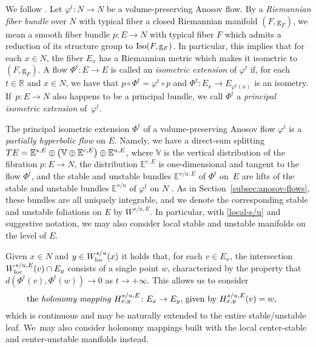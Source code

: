 \documentclass[10pt,a4paper]{amsart}
\newcommand{\g}{\mathrm{g}}
\newcommand{\R}{\mathbb{R}}
\newcommand{\E}{\mathbb{E}}
\numberwithin{equation}{section}
\theoremstyle{definition}
\begin{document}
We follow \cite[Section 2]{lefeuvre2023isometric}. Let $\varphi^t \colon N \rightarrow N$ be a volume-preserving Anosov flow. By a \emph{Riemannian fiber bundle} over $N$ with typical fiber a closed Riemannian manifold $(F,\g_F)$, we mean a smooth fiber bundle $p \colon E \rightarrow N$ with typical fiber $F$ which admits a reduction of its structure group to ${\rm Iso}(F,\g_F)$. In particular, this implies that for each $x \in N$, the fiber $E_x$ has a Riemannian metric which makes it isometric to $(F,\g_F)$. A flow $\Phi^t\colon E\to E$ is called an \emph{isometric extension} of $\varphi^t$ if, for each $t\in \R$ and $x\in N$, we have that $p\circ \Phi^t = \varphi^t\circ p$ and $\Phi^t\colon E_x\to E_{\varphi^t(x)}$ is an isometry. If~$p\colon E\to N$ also happens to be a principal bundle, we call $\Phi^t$ a \emph{principal isometric extension} of~$\varphi^t$.

The principal isometric extension $\Phi^t$ of a volume-preserving Anosov flow $\varphi^t$ is a \emph{partially hyperbolic flow} on $E$. Namely, we have a direct-sum splitting $TE = \E^{s,E} \oplus \smash{\bigl(\mathbb{V} \oplus \E^{c,E}\bigr)} \oplus \E^{u,E}$, where $\mathbb{V}$ is the vertical distribution of the fibration $p\colon E\to N$, the distribution $\E^{c,E}$ is one-dimensional and tangent to the flow $\Phi^t$, and the stable and unstable bundles $\E^{s/u,E}$ of $\Phi^t$ on~$E$ are lifts of the stable and unstable bundles $\E^{s/u}$ of $\varphi^t$ on $N$ \smash{\big(i.e., ${\rm d}p\bigl(\E^{s/u,E}\bigr) = \E^{s/u}$\big)}. As in Section~\ref{subsec:anosov-flows}, these bundles are all uniquely integrable, and we denote the corresponding stable and unstable foliations on $E$ by $W^{s/u,E}$. In particular, with \eqref{local-s/u} and suggestive notation, we may also consider local stable and unstable manifolds on the level of $E$.

Given $x\in N$ and $y\in W^{s/u}_{\rm loc}(x)$ it holds that, for each $v\in E_x$, the intersection $W^{s/u,E}_{\rm loc}(v)\cap E_y$ consists of a single point $w$, characterized by the property that $d(\Phi^t(v), \Phi^t(w))\to 0$ as $t \to +\infty$. This allows us to consider
\begin{equation}\label{holonomy-map}
 \parbox{.9\textwidth}{the \emph{holonomy mapping} $H_{x,y}^{s/u, E}\colon E_x\to E_y$, given by $H_{x,y}^{s/u,E}(v) = w$,}
\end{equation}which is continuous and may be naturally extended to the entire stable/unstable leaf. We~may also consider holonomy mappings built with the local center-stable and center-unstable manifolds instead.
\end{document}
